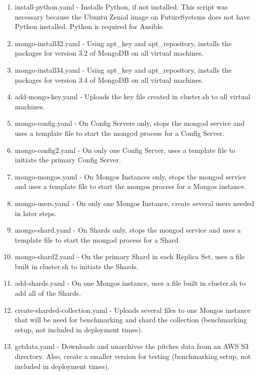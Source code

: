 \documentclass[9pt,twocolumn,twoside]{../../styles/osajnl}
\begin{document}
\begin{enumerate}


\item install-python.yaml - Installs Python, if not installed.  This script was necessary because the Ubuntu Zenial image on FutureSystems does not have Python installed.  Python is required for Ansible. 
\item mongo-install32.yaml - Using apt\_key and apt\_repository, installs the packages for version 3.2 of MongoDB on all virtual machines.
\item mongo-install34.yaml - Using apt\_key and apt\_repository, installs the packages for version 3.4 of MongoDB on all virtual machines.
\item add-mongo-key.yaml - Uploads the key file created in cluster.sh to all virtual machines.
\item mongo-config.yaml - On Config Servers only, stops the mongod service and uses a template file to start the mongod process for a Config Server.
\item mongo-config2.yaml - On only one Config Server, uses a template file to initiate the primary Config Server.
\item mongo-mongos.yaml - On Mongos Instances only, stops the mongod service and uses a template file to start the mongos process for a Mongos instance.
\item mongo-users.yaml - On only one Mongos Instance, create several users needed in later steps.
\item mongo-shard.yaml - On Shards only, stops the mongod service and uses a template file to start the mongod process for a Shard.
\item mongo-shard2.yaml - On the primary Shard in each Replica Set, uses a file built in cluster.sh to initiate the Shards.
\item add-shards.yaml - On one Mongos instance, uses a file built in cluster.sh to add all of the Shards.
\item create-sharded-collection.yaml - Uploads several files to one Mongos instance that will be need for benchmarking and shard the collection (benchmarking setup, not included in deployment times).
\item getdata.yaml - Downloads and unarchivse the pitches data from an AWS S3 directory.  Also, create a smaller version for testing (benchmarking setup, not included in deployment times).

\end{enumerate}
\end{document}
